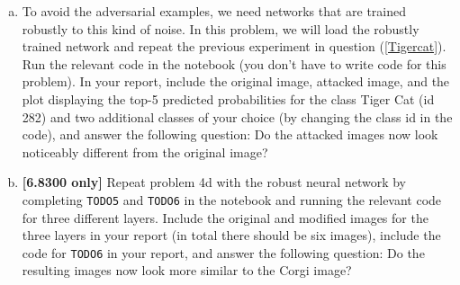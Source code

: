 \documentclass[11pt]{article}
\begin{document}
\begin{enumerate}[(a)]
\item To avoid the adversarial examples, we need networks that are trained robustly to this kind of noise.  
In this problem, we will load the robustly trained network and repeat the previous experiment in question (\ref{Tigercat}).  Run the relevant code in the notebook (you don't have to write code for this problem). In your report, include the original image, attacked image, and the plot displaying the top-5 predicted probabilities for the class Tiger Cat (id 282) and two additional classes of your choice (by changing the class id in the code), and answer the following question: Do the attacked images now look noticeably different from the original image?


\item \textbf{[6.8300 only]} Repeat problem 4d with the robust neural network by completing \texttt{TODO5} and \texttt{TODO6} in the notebook and running the relevant code for three different layers. Include the original and modified images for the three layers in your report (in total there should be six images), include the code for \texttt{TODO6} in your report, and answer the following question: Do the resulting images now look more similar to the Corgi image? 

\end{enumerate}




\end{document}
